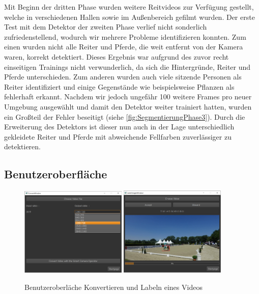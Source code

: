 Mit Beginn der dritten Phase wurden weitere Reitvideos zur Verfügung gestellt, welche in verschiedenen Hallen sowie im Außenbereich gefilmt wurden. Der erste Test mit dem Detektor der zweiten Phase verlief nicht sonderlich zufriedenstellend, wodurch wir mehrere Probleme identifizieren konnten. Zum einen wurden nicht alle Reiter und Pferde, die weit entfernt von der Kamera waren, korrekt detektiert. Dieses Ergebnis war aufgrund des zuvor recht einseitigen Trainings nicht verwunderlich, da sich die Hintergründe, Reiter und Pferde unterschieden. Zum anderen wurden auch viele sitzende Personen als Reiter identifiziert und einige Gegenstände wie beispielsweise Pflanzen als fehlerhaft erkannt. Nachdem wir jedoch ungefähr 100 weitere Frames pro neuer Umgebung ausgewählt und damit den Detektor weiter trainiert hatten, wurden ein Großteil der Fehler beseitigt (siehe \ref{fig:SegmentierungPhase3}). Durch die Erweiterung des Detektors ist dieser nun auch in der Lage unterschiedlich gekleidete Reiter und Pferde mit abweichende Fellfarben zuverlässiger zu detektieren.


\subsection*{Benutzeroberfläche}

\begin{figure}[b]
\centering
\includegraphics[width=0.45\textwidth]{./img/GuiConvert2.png}
\includegraphics[width=0.45\textwidth]{./img/GuiLabel.png}
\caption{Benutzeroberläche Konvertieren und Labeln eines Videos}
\label{fig:gui}
\end{figure}

